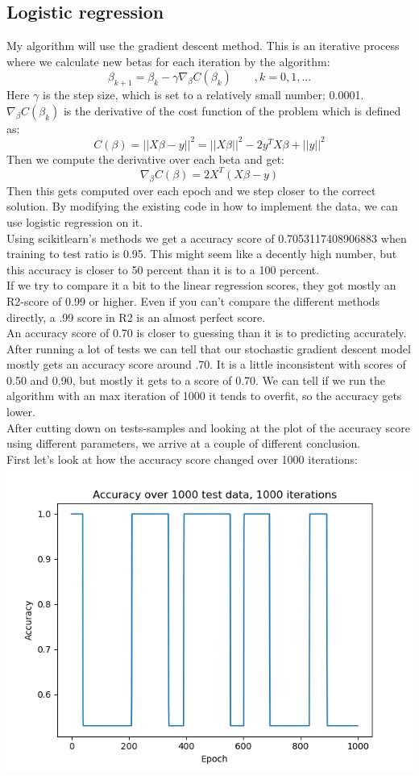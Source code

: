 \documentclass[a4paper,norsk]{article}
\begin{document}
\subsection{Logistic regression}
My algorithm will use the gradient descent method. This is an iterative process where we calculate new betas for each iteration by the algorithm:
$$
\beta_{k+1} = \beta_{k} - \gamma \nabla_{\beta} C(\beta_{k}) \qquad,k = 0, 1, ...
$$
Here $\gamma$ is the step size, which is set to a relatively small number; 0.0001. $\nabla_{\beta} C(\beta_{k})$ is the derivative of the cost function of the problem which is defined as:
$$
C(\beta) = || X\beta - y ||^2 = ||X\beta||^2 - 2y^T X \beta + ||y||^2
$$
Then we compute the derivative over each beta and get:
$$
\nabla_\beta C(\beta) = 2 X^T (X\beta - y)
$$
Then this gets computed over each epoch and we step closer to the correct solution.
By modifying the existing code in how to implement the data, we can use logistic regression on it.\\
Using scikitlearn's methods we get a accuracy score of 0.7053117408906883 when training to test ratio is 0.95. This might seem like a decently high number, but this accuracy is closer to 50 percent than it is to a 100 percent.\\
If we try to compare it a bit to the linear regression scores, they got mostly an R2-score of 0.99 or higher. Even if you can't compare the different methods directly, a .99 score in R2 is an almost perfect score.\\
An accuracy score of 0.70 is closer to guessing than it is to predicting accurately.\\
After running a lot of tests we can tell that our stochastic gradient descent model mostly gets an accuracy score around .70. It is a little inconsistent with scores of 0.50 and 0.90, but mostly it gets to a score of 0.70. We can tell if we run the algorithm with an max iteration of 1000 it tends to overfit, so the accuracy gets lower.\\
After cutting down on tests-samples and looking at the plot of the accuracy score using different parameters, we arrive at a couple of different conclusion.\\
First let's look at how the accuracy score changed over 1000 iterations:\\
\includegraphics[scale=.7]{images/logplots/1000iter1}\\
\end{document}
